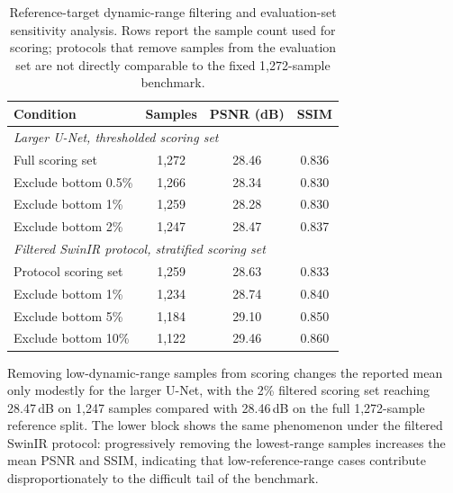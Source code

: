 \documentclass[twocolumn]{aastex631}
\begin{document}
\begin{table}[htbp]
	\centering
			\caption{Reference-target dynamic-range filtering and evaluation-set sensitivity analysis.
					Rows report the sample count used for scoring; protocols that remove samples from the evaluation set are not directly comparable to the fixed 1,272-sample benchmark.
				}
	\label{tab:filtering}
	\begin{tabular}{lccc}
		\toprule
			Condition           & Samples & PSNR (dB) & SSIM                                       \\
			\midrule
			\multicolumn{4}{l}{\textit{Larger U-Net, thresholded scoring set}} \\
			Full scoring set    & 1,272   & 28.46     & 0.836                                      \\
			Exclude bottom 0.5\%& 1,266   & 28.34     & 0.830                                      \\
			Exclude bottom 1\%  & 1,259   & 28.28     & 0.830                                      \\
			Exclude bottom 2\%  & 1,247   & 28.47     & 0.837                                      \\
			\midrule
			\multicolumn{4}{l}{\textit{Filtered SwinIR protocol, stratified scoring set}}                          \\
			Protocol scoring set& 1,259   & 28.63     & 0.833                                      \\
			Exclude bottom 1\%  & 1,234   & 28.74     & 0.840                                      \\
			Exclude bottom 5\%  & 1,184   & 29.10     & 0.850                                      \\
			Exclude bottom 10\% & 1,122   & 29.46     & 0.860                                      \\
		\bottomrule
	\end{tabular}
\end{table}

Removing low-dynamic-range samples from scoring changes the reported mean only modestly for the larger U-Net, with the 2\% filtered scoring set reaching 28.47\,dB on 1,247 samples compared with 28.46\,dB on the full 1,272-sample reference split.
The lower block shows the same phenomenon under the filtered SwinIR protocol: progressively removing the lowest-range samples increases the mean PSNR and SSIM, indicating that low-reference-range cases contribute disproportionately to the difficult tail of the benchmark.
\end{document}
